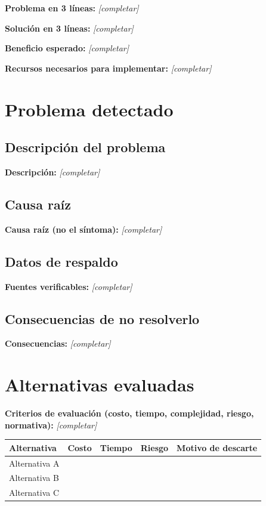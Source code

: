 \documentclass[11pt,a4paper]{article}
\newcommand{\campoVacio}[1]{\textbf{\textcolor{irdblack}{#1:}} \textcolor{irdblack}{\textit{[completar]}}\par\vspace{0.3em}}
\begin{document}
\begin{infobox}
\campoVacio{Problema en 3 líneas}
\campoVacio{Solución en 3 líneas}
\campoVacio{Beneficio esperado}
\campoVacio{Recursos necesarios para implementar}
\end{infobox}

\section{Problema detectado}

\subsection{Descripción del problema}
\campoVacio{Descripción}

\subsection{Causa raíz}
\campoVacio{Causa raíz (no el síntoma)}

\subsection{Datos de respaldo}
\campoVacio{Fuentes verificables}

\subsection{Consecuencias de no resolverlo}
\campoVacio{Consecuencias}

\section{Alternativas evaluadas}

\campoVacio{Criterios de evaluación (costo, tiempo, complejidad, riesgo, normativa)}

\vspace{0.5cm}

\begin{center}
\renewcommand{\arraystretch}{1.4}
\begin{tabular}{@{}p{3cm}p{2.2cm}p{2.2cm}p{2.2cm}>{\raggedright\arraybackslash}p{4.4cm}@{}}
\toprule
\textbf{\color{irdblack}Alternativa} & \textbf{\color{irdblack}Costo} & \textbf{\color{irdblack}Tiempo} & \textbf{\color{irdblack}Riesgo} & \textbf{\color{irdblack}Motivo de descarte} \\
\midrule
Alternativa A & & & & \\
\addlinespace
Alternativa B & & & & \\
\addlinespace
Alternativa C & & & & \\
\bottomrule
\end{tabular}
\end{center}
\end{document}
